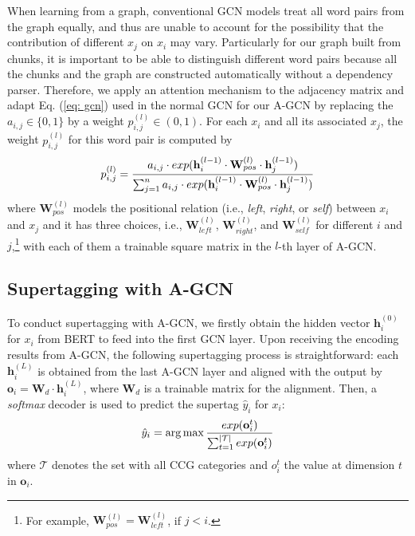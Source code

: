 \documentclass[11pt,a4paper]{article}
\begin{document}
When learning from a graph, conventional GCN models treat all word pairs from the graph equally, and thus are unable to account for the possibility that the contribution of different 
$x_j$ on $x_i$ may vary. 
Particularly for our graph built from chunks, it is important to be able to distinguish different word pairs because all the chunks and the graph are constructed automatically without a dependency parser.
Therefore, we apply an attention mechanism to the adjacency matrix and adapt Eq. (\ref{eq: gcn}) used in the normal GCN for our A-GCN by replacing the $a_{i,j} \in \{0, 1\}$ by a weight $p^{(l)}_{i,j} \in (0,1)$.
For each $x_i$ and all its associated $x_j$, the weight $p^{(l)}_{i,j}$ for this word pair is computed by
\begin{equation}
\setlength\abovedisplayskip{6pt}
\setlength\belowdisplayskip{6pt}
    p^{(l)}_{i,j} = \frac{a_{i,j} \cdot exp(\mathbf{h}^{(l-1)}_{i} \cdot \mathbf{W}^{(l)}_{pos} \cdot \mathbf{h}^{(l-1)}_{j})}
                    {\sum^{n}_{j = 1} a_{i,j} \cdot exp(\mathbf{h}^{(l-1)}_{i} \cdot \mathbf{W}^{(l)}_{pos} \cdot \mathbf{h}^{(l-1)}_{j})}
\end{equation}
where $\mathbf{W}^{(l)}_{pos}$ models the positional relation (i.e., \textit{left}, \textit{right}, or \textit{self}) between $x_i$ and $x_j$ and it has three choices, i.e., $\mathbf{W}^{(l)}_{left}$, $\mathbf{W}^{(l)}_{right}$, and $\mathbf{W}^{(l)}_{self}$ for different $i$ and $j$,\footnote{For example, $\mathbf{W}^{(l)}_{pos} = \mathbf{W}^{(l)}_{left}$, if $j < i$.} with each of them a trainable square matrix in the $l$-th layer of A-GCN.








\subsection{Supertagging with A-GCN}

To conduct supertagging with A-GCN, we firstly obtain the hidden vector $\mathbf{h}^{(0)}_{i}$ for $x_{i}$ from BERT \cite{devlin-etal-2019-bert} to feed into the first GCN layer.
Upon receiving the encoding results from A-GCN, the following supertagging process is straightforward:
each $\mathbf{h}^{(L)}_{i}$ is obtained from the last A-GCN layer and aligned with the output by $\mathbf{o}_{i} = \mathbf{W}_{d} \cdot \mathbf{h}^{(L)}_{i}$, where $\mathbf{W}_{d}$ is
a trainable matrix for the alignment.
Then, a \textit{softmax} decoder is used to predict the supertag $\hat{y}_{i}$ for $x_{i}$:
\begin{align} \label{eq:softmax}
\setlength\abovedisplayskip{6pt}
\setlength\belowdisplayskip{6pt}
    \hat{y}_{i} = \arg \max \frac{exp(\mathbf{o}^{t}_i)}
    {\sum_{t=1}^{|\mathcal{T}|} exp(\mathbf{o}^{t}_{i})} \end{align}
where $\mathcal{T}$ denotes the set with all CCG categories and $o^{t}_{i}$ the value at dimension $t$ in $\mathbf{o}_{i}$.
\end{document}
